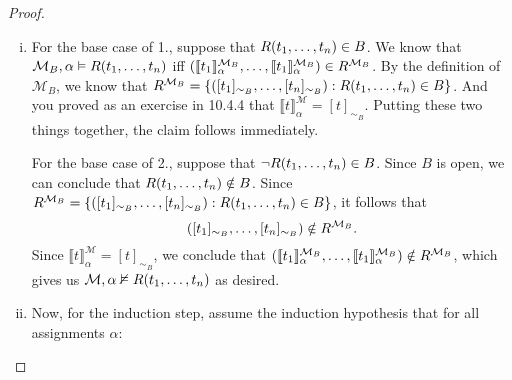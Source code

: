 \begin{enumerate}[\thesection.1]
\begin{proof}
\begin{enumerate}[(i)]
                          \item For the base case of 1., suppose that
                            $R(t_1,\mathellipsis, t_n)\in B$. We know
                            that $\mathcal{M}_B,\alpha\vDash R(t_1,
                            \mathellipsis, t_n)$ iff $(\llbracket
                            t_1\rrbracket^{\mathcal{M}_B}_\alpha,
                            \mathellipsis, \llbracket
                            t_1\rrbracket^{\mathcal{M}_B}_\alpha)\in
                            R^{\mathcal{M}_B}$. 
                            By the definition of $\mathcal{M}_B$, we
                            know that
                            $R^{\mathcal{M}_B}=\{([t_1]_{\sim_B},
                            \mathellipsis, [t_n]_{\sim_B}): R(t_1,
                            \mathellipsis, t_n)\in B\}$. And you
                            proved as an exercise in 10.4.4 that
                            $\llbracket
                            t\rrbracket_\alpha^\mathcal{M}=[t]_{\sim_B}$. Putting
                            these two things together, the claim
                            follows immediately. 

                            For the base case of 2., suppose that
                            $\neg R(t_1, \mathellipsis, t_n)\in
                            B$. Since $B$ is open, we can conclude
                            that $R(t_1,\mathellipsis, t_n)\notin
                            B$. Since $R^{\mathcal{M}_B}=\{([t_1]_{\sim_B},
                            \mathellipsis, [t_n]_{\sim_B}): R(t_1,
                            \mathellipsis, t_n)\in B\}$, it follows
                            that \[([t_1]_{\sim_B},
                            \mathellipsis, [t_n]_{\sim_B})\notin
                            R^{\mathcal{M}_B}.\] Since $\llbracket
                            t\rrbracket_\alpha^\mathcal{M}=[t]_{\sim_B}$,
                            we conclude that $(\llbracket
                            t_1\rrbracket^{\mathcal{M}_B}_\alpha,
                            \mathellipsis, \llbracket
                            t_1\rrbracket^{\mathcal{M}_B}_\alpha)\notin
                            R^{\mathcal{M}_B}$, which gives us
                            $\mathcal{M},\alpha\nvDash
                            R(t_1,\mathellipsis, t_n)$ as desired.

                            \item Now, for the induction step, assume
                              the induction hypothesis that for all
                              assignments $\alpha$:


\end{enumerate}
\end{proof}
\end{enumerate}
